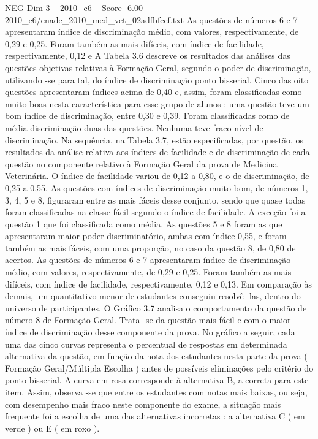 \begin{textsample}{NEG Dim 3 – 2010\_c6 – Score -6.00 – 2010\_c6/enade\_2010\_med\_vet\_02adfbfccf.txt}
As questões de números 6 e 7 apresentaram índice de discriminação médio, com valores, respectivamente, de 0,29 e 0,25.
Foram também as mais difíceis, com índice de facilidade, respectivamente, 0,12 e A Tabela 3.6 descreve os resultados das análises das questões objetivas relativas à Formação Geral, segundo o poder de discriminação, utilizando -se para tal, do índice de discriminação ponto bisserial.
Cinco das oito questões apresentaram índices acima de 0,40 e, assim, foram classificadas como muito boas nesta característica para esse grupo de alunos ; uma questão teve um bom índice de discriminação, entre 0,30 e 0,39.
Foram classificadas como de média discriminação duas das questões.
Nenhuma teve fraco nível de discriminação.
Na sequência, na Tabela 3.7, estão especificadas, por questão, os resultados da análise relativa aos índices de facilidade e de discriminação de cada questão no componente relativo à Formação Geral da prova de Medicina Veterinária.
O índice de facilidade variou de 0,12 a 0,80, e o de discriminação, de 0,25 a 0,55.
As questões com índices de discriminação muito bom, de números 1, 3, 4, 5 e 8, figuraram entre as mais fáceis desse conjunto, sendo que quase todas foram classificadas na classe fácil segundo o índice de facilidade.
A exceção foi a questão 1 que foi classificada como média.
As questões 5 e 8 foram as que apresentaram maior poder discriminatório, ambas com índice 0,55, e foram também as mais fáceis, com uma proporção, no caso da questão 8, de 0,80 de acertos.
As questões de números 6 e 7 apresentaram índice de discriminação médio, com valores, respectivamente, de 0,29 e 0,25.
Foram também as mais difíceis, com índice de facilidade, respectivamente, 0,12 e 0,13.
Em comparação às demais, um quantitativo menor de estudantes conseguiu resolvê -las, dentro do universo de participantes.
O Gráfico 3.7 analisa o comportamento da questão de número 8 de Formação Geral.
Trata -se da questão mais fácil e com o maior índice de discriminação desse componente da prova.
No gráfico a seguir, cada uma das cinco curvas representa o percentual de respostas em determinada alternativa da questão, em função da nota dos estudantes nesta parte da prova ( Formação Geral/Múltipla Escolha ) antes de possíveis eliminações pelo critério do ponto bisserial.
A curva em rosa corresponde à alternativa B, a correta para este item.
Assim, observa -se que entre os estudantes com notas mais baixas, ou seja, com desempenho mais fraco neste componente do exame, a situação mais frequente foi a escolha de uma das alternativas incorretas : a alternativa C ( em verde ) ou E ( em roxo ).

\end{textsample}
